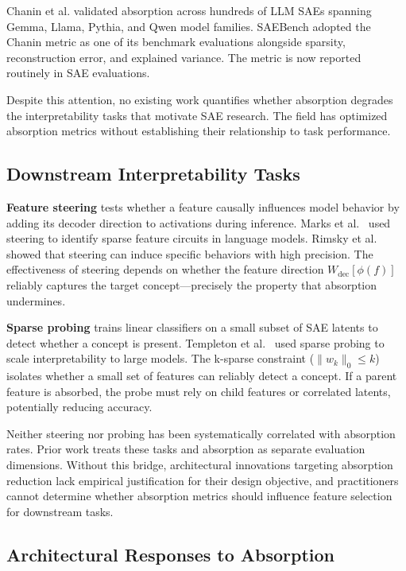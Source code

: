 \documentclass{article}
\begin{document}
Chanin et al. validated absorption across hundreds of LLM SAEs spanning Gemma, Llama, Pythia, and Qwen model families. SAEBench \cite{karvonen2025saebench} adopted the Chanin metric as one of its benchmark evaluations alongside sparsity, reconstruction error, and explained variance. The metric is now reported routinely in SAE evaluations.

Despite this attention, no existing work quantifies whether absorption degrades the interpretability tasks that motivate SAE research. The field has optimized absorption metrics without establishing their relationship to task performance.

\subsection{Downstream Interpretability Tasks}

\textbf{Feature steering} tests whether a feature causally influences model behavior by adding its decoder direction to activations during inference. Marks et al.~\cite{marks2024sparse} used steering to identify sparse feature circuits in language models. Rimsky et al.~\cite{rimsky2024steering} showed that steering can induce specific behaviors with high precision. The effectiveness of steering depends on whether the feature direction $W_{\text{dec}}[\phi(f)]$ reliably captures the target concept---precisely the property that absorption undermines.

\textbf{Sparse probing} trains linear classifiers on a small subset of SAE latents to detect whether a concept is present. Templeton et al.~\cite{templeton2024scaling} used sparse probing to scale interpretability to large models. The k-sparse constraint ($\|w_k\|_0 \leq k$) isolates whether a small set of features can reliably detect a concept. If a parent feature is absorbed, the probe must rely on child features or correlated latents, potentially reducing accuracy.

Neither steering nor probing has been systematically correlated with absorption rates. Prior work treats these tasks and absorption as separate evaluation dimensions. Without this bridge, architectural innovations targeting absorption reduction lack empirical justification for their design objective, and practitioners cannot determine whether absorption metrics should influence feature selection for downstream tasks.

\subsection{Architectural Responses to Absorption}
\end{document}
